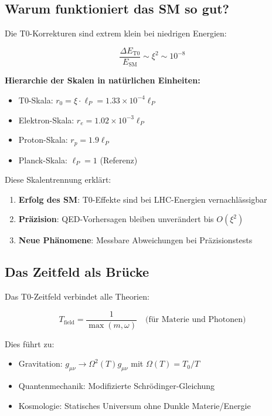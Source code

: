 	\subsection{Warum funktioniert das SM so gut?}
	
	Die T0-Korrekturen sind extrem klein bei niedrigen Energien:
	
	\begin{equation}
		\frac{\Delta E_{\text{T0}}}{E_{\text{SM}}} \sim \xi^2 \sim 10^{-8}
	\end{equation}
	
	\textbf{Hierarchie der Skalen in natürlichen Einheiten:}
	\begin{itemize}
		\item T0-Skala: $r_0 = \xi \cdot \ell_P = 1.33 \times 10^{-4} \ell_P$
		\item Elektron-Skala: $r_e = 1.02 \times 10^{-3} \ell_P$
		\item Proton-Skala: $r_p = 1.9 \ell_P$
		\item Planck-Skala: $\ell_P = 1$ (Referenz)
	\end{itemize}
	
	Diese Skalentrennung erklärt:
	\begin{enumerate}
		\item \textbf{Erfolg des SM}: T0-Effekte sind bei LHC-Energien vernachlässigbar
		\item \textbf{Präzision}: QED-Vorhersagen bleiben unverändert bis $O(\xi^2)$
		\item \textbf{Neue Phänomene}: Messbare Abweichungen bei Präzisionstests
	\end{enumerate}
	
	\subsection{Das Zeitfeld als Brücke}
	
	Das T0-Zeitfeld verbindet alle Theorien:
	
	\begin{equation}
		T_{\text{field}} = \frac{1}{\max(m, \omega)} \quad \text{(für Materie und Photonen)}
	\end{equation}
	
	Dies führt zu:
	\begin{itemize}
		\item Gravitation: $g_{\mu\nu} \to \Omega^2(T) g_{\mu\nu}$ mit $\Omega(T) = T_0/T$
		\item Quantenmechanik: Modifizierte Schrödinger-Gleichung
		\item Kosmologie: Statisches Universum ohne Dunkle Materie/Energie
	\end{itemize}
	
